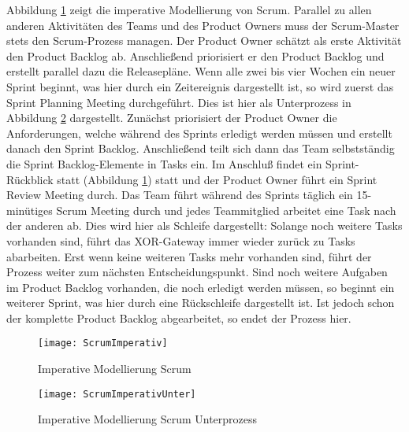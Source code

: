 Abbildung \ref{fig:ScrumImperativ} zeigt die imperative Modellierung von Scrum. Parallel zu allen anderen Aktivitäten des Teams und des Product Owners muss der Scrum-Master stets den Scrum-Prozess managen. \newline
Der Product Owner schätzt als erste Aktivität den Product Backlog ab. Anschließend priorisiert er den Product Backlog und erstellt parallel dazu die Releasepläne. \newline
Wenn alle zwei bis vier Wochen ein neuer Sprint beginnt, was hier durch ein Zeitereignis dargestellt ist, so wird zuerst das Sprint Planning Meeting durchgeführt. Dies ist hier als Unterprozess in Abbildung \ref{fig:ScrumImperativUnter} dargestellt. Zunächst priorisiert der Product Owner die Anforderungen, welche während des Sprints erledigt werden müssen und erstellt danach den Sprint Backlog. Anschließend teilt sich dann das Team selbstständig die Sprint Backlog-Elemente in Tasks ein.\newline
Im Anschluß findet ein Sprint-Rückblick statt (Abbildung \ref{fig:ScrumImperativ}) statt und der Product Owner führt ein Sprint Review Meeting durch.\newline
Das Team führt während des Sprints täglich ein 15-minütiges Scrum Meeting durch und jedes Teammitglied arbeitet eine Task nach der anderen ab. Dies wird hier als Schleife dargestellt: Solange noch weitere Tasks vorhanden sind, führt das XOR-Gateway immer wieder zurück zu Tasks abarbeiten. Erst wenn keine weiteren Tasks mehr vorhanden sind, führt der Prozess weiter zum nächsten Entscheidungspunkt.\newline
Sind noch weitere Aufgaben im Product Backlog vorhanden, die noch erledigt werden müssen, so beginnt ein weiterer Sprint, was hier durch eine Rückschleife dargestellt ist. Ist jedoch schon der komplette Product Backlog abgearbeitet, so endet der Prozess hier.


\begin{figure}[htp]
\begin{center}
  \texttt{[image: ScrumImperativ]} %
  \caption{Imperative Modellierung Scrum}
  \label{fig:ScrumImperativ}
\end{center}
\end{figure}

\begin{figure}[htp]
\begin{center}
  \texttt{[image: ScrumImperativUnter]} %
  \caption{Imperative Modellierung Scrum Unterprozess}
  \label{fig:ScrumImperativUnter}
\end{center}
\end{figure}
\clearpage

